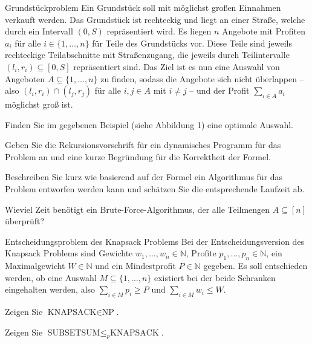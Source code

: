 \documentclass{article}
\begin{document}
\begin{eexercises}{Grundstückproblem}{
    Ein Grundstück soll mit möglichst großen Einnahmen verkauft werden. Das Grundstück ist rechteckig und liegt an einer Straße, welche durch ein Intervall $(0, S)$ repräsentiert wird. Es liegen $n$ Angebote mit Profiten $a_i$ für alle $i \in \{1, \ldots, n\}$ für Teile des Grundstücks vor. Diese Teile sind jeweils rechteckige Teilabschnitte mit Straßenzugang, die jeweils durch Teilintervalle $(l_i, r_i) \subseteq [0, S]$ repräsentiert sind. Das Ziel ist es nun eine Auswahl von Angeboten $A \subseteq \{1, \ldots, n\}$ zu finden, sodass die Angebote sich nicht überlappen – also $(l_i, r_i) \cap (l_j, r_j)$ für alle $i,j \in A$ mit $i \neq j$ – und der Profit $\sum_{i \in A} a_i$ möglichst groß ist.
  }
  \item Finden Sie im gegebenen Beispiel (siehe Abbildung 1) eine optimale Auswahl.
  \item Geben Sie die Rekursionsvorschrift für ein dynamisches Programm für das Problem an und eine kurze Begründung für die Korrektheit der Formel.
  \item Beschreiben Sie kurz wie basierend auf der Formel ein Algorithmus für das Problem entworfen werden kann und schätzen Sie die entsprechende Laufzeit ab.
  \item Wieviel Zeit benötigt ein Brute-Force-Algorithmus, der alle Teilmengen $A \subseteq [n]$ überprüft?
\end{eexercises}

\begin{eexercises}{Entscheidungsproblem des Knapsack Problems}{
    Bei der Entscheidungsversion des Knapsack Problems sind Gewichte $w_1, \ldots, w_n \in \mathbb{N}$, Profite $p_1, \ldots, p_n \in \mathbb{N}$, ein Maximalgewicht $W \in \mathbb{N}$ und ein Mindestprofit $P \in \mathbb{N}$ gegeben. Es soll entschieden werden, ob eine Auswahl $M \subseteq \{1, \ldots, n\}$ existiert bei der beide Schranken eingehalten werden, also $\sum_{i \in M} p_i \geq P$ und $\sum_{i \in M} w_i \leq W$.
  }
  \item Zeigen Sie $\text{KNAPSACK} \in \text{NP}$.
  \item Zeigen Sie $\text{SUBSETSUM} \leq_p \text{KNAPSACK}$.
\end{eexercises}
\end{document}
